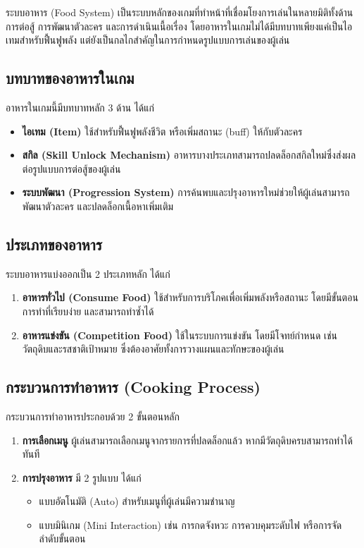 ระบบอาหาร (Food System) เป็นระบบหลักของเกมที่ทำหน้าที่เชื่อมโยงการเล่นในหลายมิติทั้งด้านการต่อสู้ การพัฒนาตัวละคร และการดำเนินเนื้อเรื่อง โดยอาหารในเกมไม่ได้มีบทบาทเพียงแค่เป็นไอเทมสำหรับฟื้นฟูพลัง แต่ยังเป็นกลไกสำคัญในการกำหนดรูปแบบการเล่นของผู้เล่น

\subsection{บทบาทของอาหารในเกม}
อาหารในเกมนี้มีบทบาทหลัก 3 ด้าน ได้แก่
\begin{itemize}
\item \textbf{ไอเทม (Item)} ใช้สำหรับฟื้นฟูพลังชีวิต หรือเพิ่มสถานะ (buff) ให้กับตัวละคร
\item \textbf{สกิล (Skill Unlock Mechanism)} อาหารบางประเภทสามารถปลดล็อกสกิลใหม่ซึ่งส่งผลต่อรูปแบบการต่อสู้ของผู้เล่น
\item \textbf{ระบบพัฒนา (Progression System)} การค้นพบและปรุงอาหารใหม่ช่วยให้ผู้เล่นสามารถพัฒนาตัวละคร และปลดล็อกเนื้อหาเพิ่มเติม
\end{itemize}

\subsection{ประเภทของอาหาร}
ระบบอาหารแบ่งออกเป็น 2 ประเภทหลัก ได้แก่
\begin{enumerate}
\item \textbf{อาหารทั่วไป (Consume Food)} ใช้สำหรับการบริโภคเพื่อเพิ่มพลังหรือสถานะ โดยมีขั้นตอนการทำที่เรียบง่าย และสามารถทำซ้ำได้
\item \textbf{อาหารแข่งขัน (Competition Food)} ใช้ในระบบการแข่งขัน โดยมีโจทย์กำหนด เช่น วัตถุดิบและรสชาติเป้าหมาย ซึ่งต้องอาศัยทั้งการวางแผนและทักษะของผู้เล่น
\end{enumerate}

\subsection{กระบวนการทำอาหาร (Cooking Process)}

กระบวนการทำอาหารประกอบด้วย 2 ขั้นตอนหลัก

\begin{enumerate}
\item \textbf{การเลือกเมนู}  
ผู้เล่นสามารถเลือกเมนูจากรายการที่ปลดล็อกแล้ว หากมีวัตถุดิบครบสามารถทำได้ทันที

\item \textbf{การปรุงอาหาร}  
มี 2 รูปแบบ ได้แก่
\begin{itemize}
\item แบบอัตโนมัติ (Auto) สำหรับเมนูที่ผู้เล่นมีความชำนาญ
\item แบบมินิเกม (Mini Interaction) เช่น การกดจังหวะ การควบคุมระดับไฟ หรือการจัดลำดับขั้นตอน
\end{itemize}
\end{enumerate}


